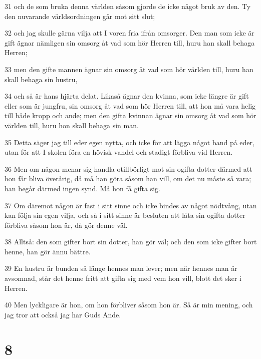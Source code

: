 \par 31 och de som bruka denna världen såsom gjorde de icke något bruk av den. Ty den nuvarande världsordningen går mot sitt slut;
\par 32 och jag skulle gärna vilja att I voren fria ifrån omsorger. Den man som icke är gift ägnar nämligen sin omsorg åt vad som hör Herren till, huru han skall behaga Herren;
\par 33 men den gifte mannen ägnar sin omsorg åt vad som hör världen till, huru han skall behaga sin hustru,
\par 34 och så är hans hjärta delat. Likaså ägnar den kvinna, som icke längre är gift eller som är jungfru, sin omsorg åt vad som hör Herren till, att hon må vara helig till både kropp och ande; men den gifta kvinnan ägnar sin omsorg åt vad som hör världen till, huru hon skall behaga sin man.
\par 35 Detta säger jag till eder egen nytta, och icke för att lägga något band på eder, utan för att I skolen föra en hövisk vandel och stadigt förbliva vid Herren.
\par 36 Men om någon menar sig handla otillbörligt mot sin ogifta dotter därmed att hon får bliva överårig, då må han göra såsom han vill, om det nu måste så vara; han begår därmed ingen synd. Må hon få gifta sig.
\par 37 Om däremot någon är fast i sitt sinne och icke bindes av något nödtvång, utan kan följa sin egen vilja, och så i sitt sinne är besluten att låta sin ogifta dotter förbliva såsom hon är, då gör denne väl.
\par 38 Alltså: den som gifter bort sin dotter, han gör väl; och den som icke gifter bort henne, han gör ännu bättre.
\par 39 En hustru är bunden så länge hennes man lever; men när hennes man är avsomnad, står det henne fritt att gifta sig med vem hon vill, blott det sker i Herren.
\par 40 Men lyckligare är hon, om hon förbliver såsom hon är. Så är min mening, och jag tror att också jag har Guds Ande.

\chapter{8}


